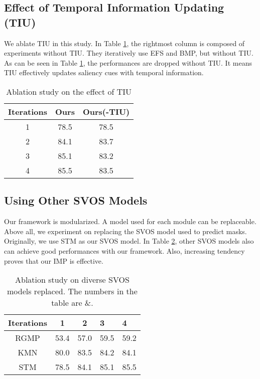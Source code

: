 \documentclass[letterpaper]{article} \usepackage{aaai22}  \usepackage{times}  \usepackage{helvet}  \usepackage{courier}  \usepackage[hyphens]{url}  \usepackage{graphicx} \urlstyle{rm} \def\UrlFont{\rm}  \usepackage{natbib}  \usepackage{caption} \DeclareCaptionStyle{ruled}{labelfont=normalfont,labelsep=colon,strut=off} \frenchspacing  \setlength{\pdfpagewidth}{8.5in}  \setlength{\pdfpageheight}{11in}  \usepackage{algorithm}
\begin{document}
\subsection{Effect of Temporal Information Updating (TIU)}

We ablate TIU in this study.
In Table \ref{table6}, the rightmost column is composed of experiments without TIU. They iteratively use EFS and BMP, but without TIU. As can be seen in Table \ref{table6}, the performances are dropped without TIU.
It means TIU effectively updates saliency cues with temporal information.

\begin{table}[h]
\centering
\caption{Ablation study on the effect of TIU}
\label{table6}
\begin{tabular}{@{}c|cc@{}}
\toprule
Iterations & Ours & Ours(-TIU) \\ \midrule
1          & 78.5 & 78.5       \\
2          & 84.1 & 83.7       \\
3          & 85.1 & 83.2       \\
4          & 85.5 & 83.5       \\ \bottomrule
\end{tabular}
\end{table}

\subsection{Using Other SVOS Models}

Our framework is modularized. A model used for each module can be replaceable. Above all, we experiment on replacing the SVOS model used to predict masks. Originally, we use STM \citep{oh2019video} as our SVOS model. In Table \ref{table7}, other SVOS models \citep{oh2018fast,seong2020kernelized} also can achieve good performances with our framework. Also, increasing tendency proves that our IMP is effective.

\begin{table}[h]
\centering
\caption{Ablation study on diverse SVOS models replaced. The numbers in the table are \&.}
\label{table7}
\begin{tabular}{@{}c|ccll@{}}
\toprule
Iterations & 1    & 2    & 3    & 4    \\ \midrule
RGMP       & 53.4 & 57.0 & 59.5 & 59.2 \\
KMN        & 80.0 & 83.5 & 84.2 & 84.1 \\
STM        & 78.5 & 84.1 & 85.1 & 85.5 \\ \bottomrule
\end{tabular}
\end{table}
\end{document}
